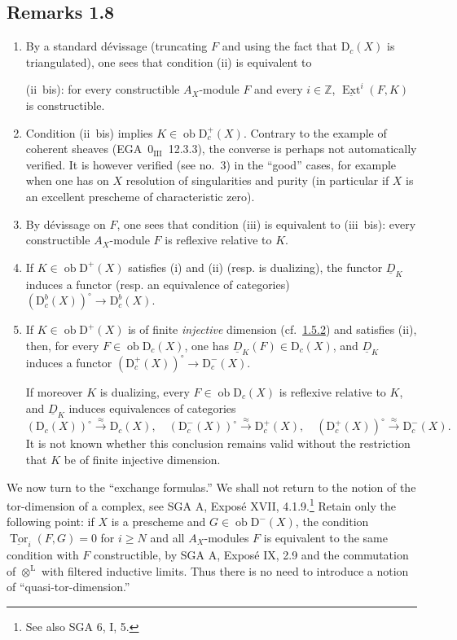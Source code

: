 \documentclass[11pt]{article}
\DeclareMathOperator{\Ext}{Ext}
\DeclareMathOperator{\Tor}{Tor}
\newcommand{\D}{\mathrm{D}}
\newcommand{\Z}{\mathbb{Z}}
\newcommand{\ob}{\operatorname{ob}}
\providecommand{\ob}{\operatorname{ob}}
\providecommand{\Z}{\mathbb Z}
\begin{document}
\subsection*{Remarks 1.8}\label{sga5:I:remark:1.8}
\begin{enumerate}[label=\alph*)]
\item By a standard dévissage (truncating $F$ and using the fact that $\D_c(X)$ is triangulated), one sees that condition (ii) is equivalent to

(ii~bis): for every constructible $A_X$-module $F$ and every $i \in \Z$, $\underline{\Ext}^i(F,K)$ is constructible.

\item Condition (ii~bis) implies $K \in \ob \D_c^{+}(X)$. Contrary to the example of coherent sheaves (EGA~$0_{\mathrm{III}}$~12.3.3), the converse is perhaps not automatically verified. It is however verified (see no.~3) in the ``good'' cases, for example when one has on $X$ resolution of singularities and purity (in particular if $X$ is an excellent prescheme of characteristic zero).

\item By dévissage on $F$, one sees that condition (iii) is equivalent to (iii~bis): every constructible $A_X$-module $F$ is reflexive relative to $K$.

\item If $K \in \ob \D^{+}(X)$ satisfies (i) and (ii) (resp. is dualizing), the functor $\underline{D}_K$ induces a functor (resp. an equivalence of categories) $(\D_c^{b}(X))^{\circ} \to \D_c^{b}(X)$.

\item If $K \in \ob \D^{+}(X)$ is of finite \emph{injective} dimension (cf.~\hyperref[sga5:I:remark:1.5.2]{1.5.2}) and satisfies (ii), then, for every $F \in \ob \D_c(X)$, one has $\underline{D}_K(F) \in \D_c(X)$, and $\underline{D}_K$ induces a functor $(\D_c^{+}(X))^{\circ} \to \D_c^{-}(X)$.

If moreover $K$ is dualizing, every $F \in \ob \D_c(X)$ is reflexive relative to $K$, and $\underline{D}_K$ induces equivalences of categories
\[
(\D_c(X))^{\circ} \xrightarrow{\approx} \D_c(X), \quad (\D_c^{-}(X))^{\circ} \xrightarrow{\approx} \D_c^{+}(X), \quad (\D_c^{+}(X))^{\circ} \xrightarrow{\approx} \D_c^{-}(X).
\]
It is not known whether this conclusion remains valid without the restriction that $K$ be of finite injective dimension.
\end{enumerate}

We now turn to the ``exchange formulas.'' We shall not return to the notion of the tor-dimension of a complex, see SGA A, Exposé XVII, 4.1.9.\footnote{See also SGA 6, I, 5.} Retain only the following point: if $X$ is a prescheme and $G\in\ob\D^-(X)$, the condition $\underline{\Tor}_i(F,G)=0$ for $i\geqslant N$ and all $A_X$-modules $F$ is equivalent to the same condition with $F$ constructible, by SGA A, Exposé IX, 2.9 and the commutation of $\otimes^{\mathrm L}$ with filtered inductive limits. Thus there is no need to introduce a notion of ``quasi-tor-dimension.''
\end{document}
